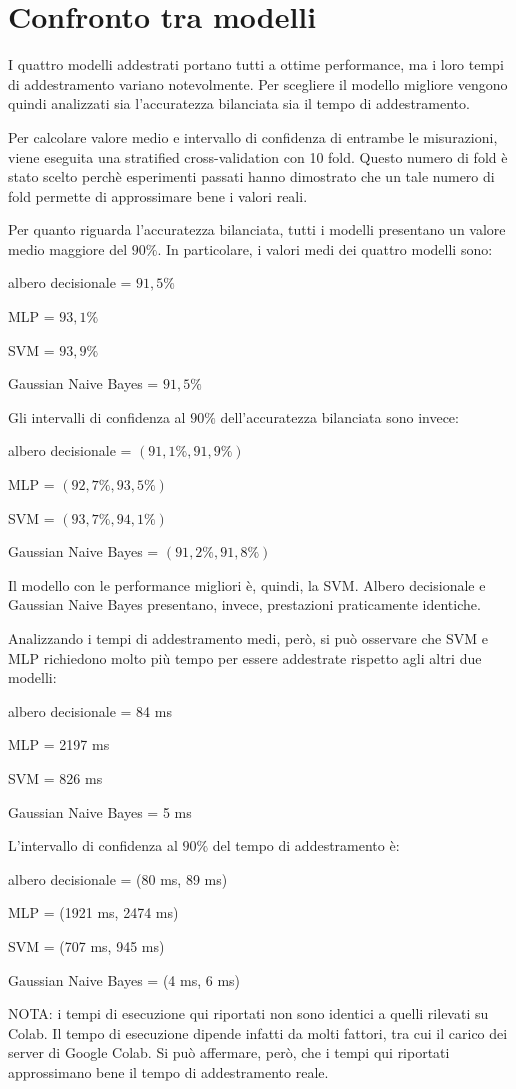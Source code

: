 \section{Confronto tra modelli}
I quattro modelli addestrati portano tutti a ottime performance, ma i loro 
tempi di addestramento variano notevolmente.
Per scegliere il modello migliore vengono quindi analizzati sia l'accuratezza
bilanciata sia il tempo di addestramento.

Per calcolare valore medio e intervallo di confidenza di entrambe
le misurazioni, viene eseguita
una stratified cross-validation con 10 fold. Questo numero di fold è stato 
scelto perchè esperimenti passati hanno dimostrato che un tale numero di fold
permette di approssimare bene i valori reali.

Per quanto riguarda l'accuratezza bilanciata, tutti i modelli presentano un
valore medio maggiore del $90\%$. In particolare, i valori medi dei quattro modelli
sono: \begin{itemize*}
    \item albero decisionale = $91,5\%$
    \item MLP = $93,1\%$
    \item SVM = $93,9\%$
    \item Gaussian Naive Bayes = $91,5\%$
\end{itemize*}
Gli intervalli di confidenza al $90\%$ dell'accuratezza bilanciata sono invece:
\begin{itemize*}
    \item albero decisionale = $(91,1\%, 91,9\%)$
    \item MLP = $(92,7\%, 93,5\%)$
    \item SVM = $(93,7\%, 94,1\%)$
    \item Gaussian Naive Bayes = $(91,2\%, 91,8\%)$
\end{itemize*}
Il modello con le performance migliori è, quindi, la SVM. Albero decisionale e
Gaussian Naive Bayes presentano, invece, prestazioni praticamente identiche.

Analizzando i tempi di addestramento medi, però, si può osservare che
SVM e MLP richiedono molto più tempo per essere addestrate rispetto
agli altri due modelli: \begin{itemize*}
    \item albero decisionale = 84 ms
    \item MLP = 2197 ms
    \item SVM = 826 ms
    \item Gaussian Naive Bayes = 5 ms
\end{itemize*}
L'intervallo di confidenza al $90\%$ del tempo di addestramento è: \begin{itemize*}
    \item albero decisionale = (80 ms, 89 ms)
    \item MLP = (1921 ms, 2474 ms)
    \item SVM = (707 ms, 945 ms)
    \item Gaussian Naive Bayes = (4 ms, 6 ms)
\end{itemize*}

NOTA: i tempi di esecuzione qui riportati non sono identici a quelli rilevati
su Colab. Il tempo di esecuzione dipende infatti da molti fattori, tra cui il 
carico dei server di Google Colab. Si può affermare, però, che i tempi qui
riportati approssimano bene il tempo di addestramento reale.